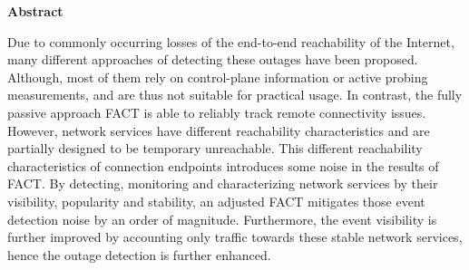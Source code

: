 

%
%
%
%
%
%
%
%
%
%
\clearpage \null 
\vfil 
\begin{center}
	\textbf{Abstract} 
\end{center}

Due to commonly occurring losses of the end-to-end reachability of the Internet, 
many different approaches of detecting these outages have been proposed. 
Although, most of them rely on control-plane information or active probing 
measurements, and are thus not suitable for practical usage. In contrast, the 
fully passive approach FACT is able to reliably track remote connectivity 
issues. 
However, network services have different reachability characteristics and are 
partially designed to be temporary unreachable. This different reachability 
characteristics of connection endpoints introduces some noise in the results of 
FACT. By detecting, monitoring and characterizing network services by their 
visibility, popularity and stability, an adjusted FACT mitigates those event 
detection noise by an order of magnitude. Furthermore, the event visibility is 
further improved by accounting only traffic towards these stable network 
services, hence the outage detection is further enhanced. 

